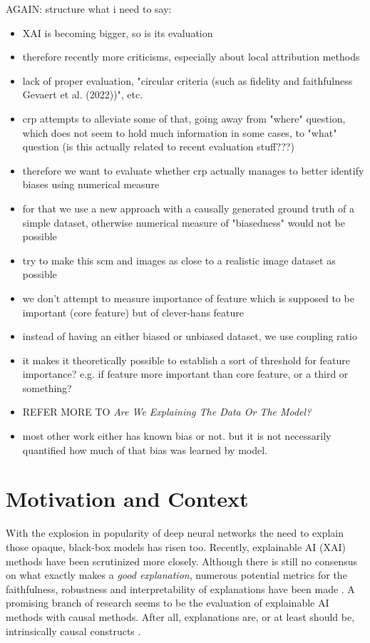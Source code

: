 AGAIN: structure what i need to say:
\begin{itemize}
    \item XAI is becoming bigger, so is its evaluation
    \item therefore recently more criticisms, especially about local attribution methods
    \item lack of proper evaluation, "circular criteria (such as fidelity and faithfulness Gevaert et al. (2022))", \cite{Adebayo2018, Sixt2020, Wilming2023} etc.
    \item crp attempts to alleviate some of that, going away from "where" question, which does not seem to hold much information in some cases, to "what" question (is this actually related to recent evaluation stuff???)
    \item therefore we want to evaluate whether crp actually manages to better identify biases using numerical measure
    \item for that we use a new approach with a causally generated ground truth of a simple dataset, otherwise numerical measure of "biasedness" would not be possible
    \item try to make this scm and images as close to a realistic image dataset as possible
    \item we don't attempt to measure importance of feature which is supposed to be important (core feature) but of clever-hans feature
    \item instead of having an either biased or unbiased dataset, we use coupling ratio
    \item it makes it theoretically possible to establish a sort of threshold for feature importance? e.g. if feature more important than core feature, or a third or something?
    \item REFER MORE TO \textit{Are We Explaining The Data Or The Model?}
    \item most other work either has known bias or not. but it is not necessarily quantified how much of that bias was learned by model. 
\end{itemize}

\section{Motivation and Context}
With the explosion in popularity of deep neural networks the need to explain those opaque, black-box models has risen too. Recently, explainable AI (XAI) methods have been scrutinized more closely. Although there is still no consensus on what exactly makes a \textit{good explanation}, numerous potential metrics for the faithfulness, robustness and interpretability of explanations have been made \cite{?}. A promising branch of research seems to be the evaluation of explainable AI methods with causal methods. After all, explanations are, or at least should be, intrinsically causal constructs \cite{Woodward2004, Halpern2005, Schoelkopf2019}.\\

